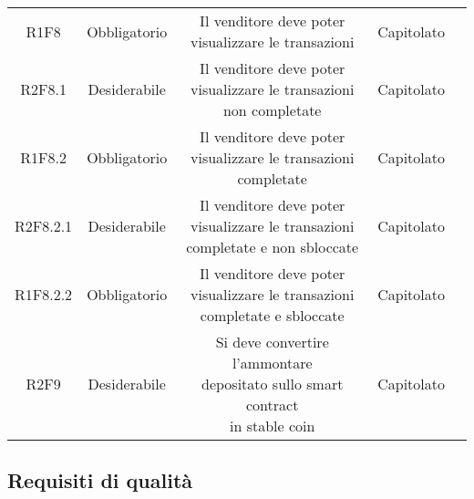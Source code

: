 \begin{center}
\begin{longtable}[c]{c | c | c | c | p{5cm}}
        R1F8 & Obbligatorio & \shortstack{Il venditore deve poter \\visualizzare le transazioni} & Capitolato \\
        R2F8.1 & Desiderabile & \shortstack{Il venditore deve poter \\visualizzare le transazioni \\non completate} & Capitolato \\
        R1F8.2 & Obbligatorio & \shortstack{Il venditore deve poter \\visualizzare le transazioni completate} & Capitolato \\
        R2F8.2.1 & Desiderabile & \shortstack{Il venditore deve poter \\visualizzare le transazioni \\completate e non sbloccate} & Capitolato \\
        R1F8.2.2 & Obbligatorio & \shortstack{Il venditore deve poter \\visualizzare le transazioni\\ completate e sbloccate} & Capitolato \\
        R2F9 & Desiderabile & \shortstack{Si deve convertire l'ammontare \\depositato sullo smart contract \\in stable coin} & Capitolato \\
    \end{longtable}
\end{center} 
\clearpage

\subsection{Requisiti di qualità}

